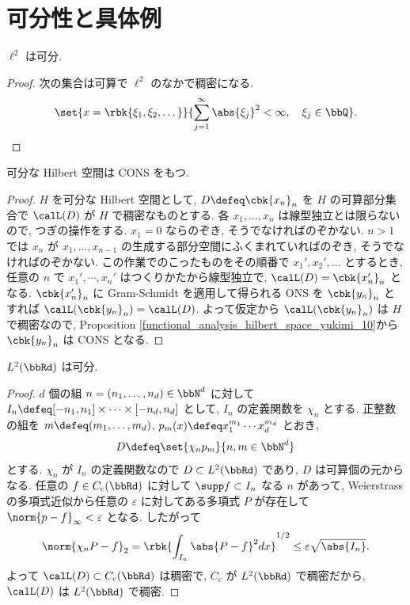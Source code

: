 \documentclass[openany, a4paper, oneside]{jsbook}
\begin{document}
\section{可分性と具体例}

\begin{prop}
 $\ell^2$ は可分.
\end{prop}
\begin{proof}
次の集合は可算で $\ell^2$ のなかで稠密になる.
\begin{align}
 \set{x = \rbk{\xi_1, \xi_2, \dots}}{\sum_{j=1}^{\infty} \abs{\xi_j}^2 < \infty, \quad \xi_j \in \bbQ}.
\end{align}
\end{proof}

\begin{thm}
 可分な Hilbert 空間は CONS をもつ.
\end{thm}
\begin{proof}
$H$ を可分な Hilbert 空間として, $D \defeq \cbk{x_n}_n$ を $H$ の可算部分集合で
$\calL (D)$ が $H$ で稠密なものとする.
各 $x_1, \dots, x_n$ は線型独立とは限らないので, つぎの操作をする.
$x_1 = 0$ ならのぞき, そうでなければのぞかない.
$n > 1$ では $x_n$ が $x_1, \dots, x_{n-1}$ の生成する部分空間にふくまれていればのぞき, そうでなければのぞかない.
この作業でのこったものをその順番で $x_{1}', x_{2}', \dots$ とするとき,
任意の $n$ で $x_{1}', \cdots, x_{n}'$ はつくりかたから線型独立で,
$\calL(D) = \cbk{x_{n}'}_{n}$ となる.
$\cbk{x_n'}_n$ に Gram-Schmidt を適用して得られる ONS を $\cbk{y_n}_n$ とすれば
$\calL(\cbk{y_n}_n) = \calL (D)$.
よって仮定から $\calL (\cbk{y_n}_n)$ は $H$ で稠密なので,
Proposition \ref{functional_analysis_hilbert_space_yukimi_10}から $\cbk{y_n}_n$ は CONS となる.
\end{proof}

\begin{thm}
 $L^2 (\bbRd)$ は可分.
\end{thm}
\begin{proof}
$d$ 個の組 $n = (n_{1}, \dots, n_{d}) \in \bbN^d$ に対して
$I_{n} \defeq [-n_{1}, n_{1}] \times \cdots \times[-n_{d}, n_{d}]$
として, $I_{n}$ の定義関数を $\chi_{n}$ とする.
正整数の組を $m \defeq  (m_1, \dots, m_d)$, $p_m (x) \defeq x_1^{m_1} \cdots x_d^{m_d}$ とおき,
\begin{align}
 D
 \defeq
 \set{\chi_n p_m}{n, m \in \bbN^d}
\end{align}
とする.
$\chi_{n}$ が $I_{n}$ の定義関数なので $D \subset L^2 (\bbRd)$ であり, $D$ は可算個の元からなる.
任意の $f \in C_{\mathrm{c}}(\bbRd)$ に対して $\supp f \subset I_{n}$ なる $n$ があって,
Weierstrass の多項式近似から任意の $\varepsilon$ に対してある多項式 $P$ が存在して
$\norm{p - f}_{\infty} < \varepsilon$ となる.
したがって
\begin{align}
 \norm{\chi_n P -f}_{2}
 =
 \rbk{\int_{I_n} \abs{P - f}^2 dx}^{1/2}
 \leq
 \varepsilon \sqrt{\abs{I_n}}.
\end{align}
よって $\calL (D)\subset C_{\mathrm{c}}(\bbRd)$ は稠密で,
$C_{\mathrm{c}}$ が $L^2 (\bbRd)$ で稠密だから, $\calL (D)$ は $L^2 (\bbRd)$ で稠密.
\end{proof}
\end{document}
